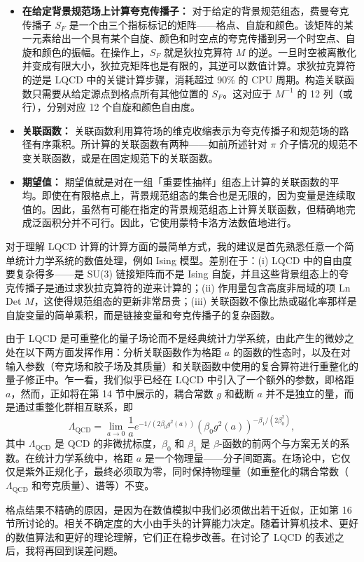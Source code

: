\begin{itemize}
  \item \textbf{在给定背景规范场上计算夸克传播子：} 对于给定的背景规范组态，费曼夸克传播子 $S_F$ 是一个由三个指标标记的矩阵——格点、自旋和颜色。该矩阵的某一元素给出一个具有某个自旋、颜色和时空点的夸克传播到另一个时空点、自旋和颜色的振幅。在操作上，$S_F$ 就是狄拉克算符 $M$ 的逆。一旦时空被离散化并变成有限大小，狄拉克矩阵也是有限的，其逆可以数值计算。求狄拉克算符的逆是 LQCD 中的关键计算步骤，消耗超过 90\% 的 CPU 周期。构造关联函数只需要从给定源点到格点所有其他位置的 $S_F$。这对应于 $M^{-1}$ 的 12 列（或行），分别对应 12 个自旋和颜色自由度。
  \item \textbf{关联函数：} 关联函数利用算符场的维克收缩表示为夸克传播子和规范场的路径有序乘积。所计算的关联函数有两种——如前所述针对 $\pi$ 介子情况的规范不变关联函数，或是在固定规范下的关联函数。
  \item \textbf{期望值：} 期望值就是对在一组「重要性抽样」组态上计算的关联函数的平均。即使在有限格点上，背景规范组态的集合也是无限的，因为变量是连续取值的。因此，虽然有可能在指定的背景规范组态上计算关联函数，但精确地完成泛函积分并不可行。因此，它使用蒙特卡洛方法数值地进行。
\end{itemize}

对于理解 LQCD 计算的计算方面的最简单方式，我的建议是首先熟悉任意一个简单统计力学系统的数值处理，例如 Ising 模型。差别在于：(i) LQCD 中的自由度要复杂得多——是 SU(3) 链接矩阵而不是 Ising 自旋，并且这些背景组态上的夸克传播子是通过求狄拉克算符的逆来计算的；(ii) 作用量包含高度非局域的项 Ln Det $M$，这使得规范组态的更新非常昂贵；(iii) 关联函数不像比热或磁化率那样是自旋变量的简单乘积，而是链接变量和夸克传播子的复杂函数。

由于 LQCD 是可重整化的量子场论而不是经典统计力学系统，由此产生的微妙之处在以下两方面发挥作用：分析关联函数作为格距 $a$ 的函数的性态时，以及在对输入参数（夸克场和胶子场及其质量）和关联函数中使用的复合算符进行重整化的量子修正中。乍一看，我们似乎已经在 LQCD 中引入了一个额外的参数，即格距 $a$，然而，正如将在第 14 节中展示的，耦合常数 $g$ 和截断 $a$ 并不是独立的量，而是通过重整化群相互联系，即
\begin{equation}
  \Lambda_\mathrm{QCD} = \lim_{a\to 0} \frac{1}{a} e^{-1/(2\beta_0 g^2(a))} \left( \beta_0 g^2(a) \right)^{-\beta_1/(2\beta_0^2)},
  \label{eq:lambdacd}
\end{equation}
其中 $\Lambda_\mathrm{QCD}$ 是 QCD 的非微扰标度，$\beta_0$ 和 $\beta_1$ 是 $\beta$-函数的前两个与方案无关的系数。在统计力学系统中，格距 $a$ 是一个物理量——分子间距离。在场论中，它仅仅是紫外正规化子，最终必须取为零，同时保持物理量（如重整化的耦合常数（$\Lambda_\mathrm{QCD}$ 和夸克质量）、谱等）不变。

格点结果不精确的原因，是因为在数值模拟中我们必须做出若干近似，正如第 16 节所讨论的。相关不确定度的大小由手头的计算能力决定。随着计算机技术、更好的数值算法和更好的理论理解，它们正在稳步改善。在讨论了 LQCD 的表述之后，我将再回到误差问题。
